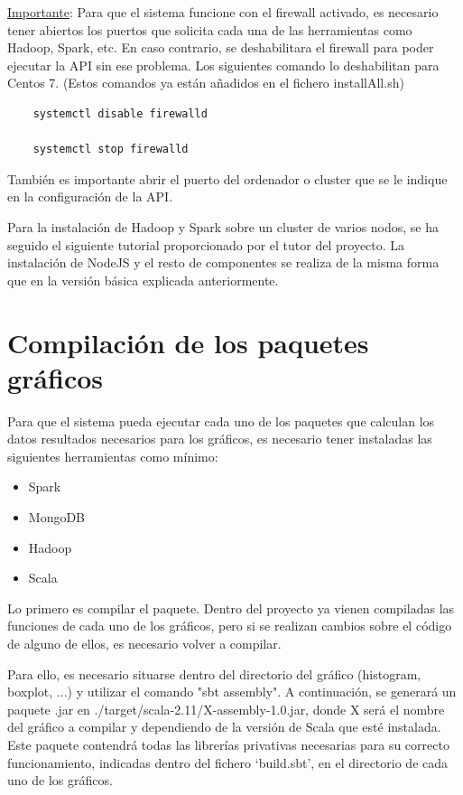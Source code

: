 \underline{Importante}: Para que el sistema funcione con el firewall activado, es necesario tener abiertos los puertos que solicita cada una de las herramientas como Hadoop, Spark, etc. En caso contrario, se deshabilitara el firewall para poder ejecutar la API sin ese problema. Los siguientes comando lo deshabilitan para Centos 7. (Estos comandos ya están añadidos en el fichero installAll.sh)

\begin{verbatim}
	systemctl disable firewalld
	
	systemctl stop firewalld
\end{verbatim}

También es importante abrir el puerto del ordenador o cluster que se le indique en la configuración de la API.

Para la instalación de Hadoop y Spark sobre un cluster de varios nodos, se ha seguido el siguiente tutorial \cite{InstalacionHadoopSparkNodos} proporcionado por el tutor del proyecto. La instalación de NodeJS y el resto de componentes se realiza de la misma forma que en la versión básica explicada anteriormente. 

\section{Compilación de los paquetes gráficos}

Para que el sistema pueda ejecutar cada uno de los paquetes que calculan los datos resultados necesarios para los gráficos, es necesario tener instaladas las siguientes herramientas como mínimo:
\begin{itemize}
	\item Spark
	\item MongoDB
	\item Hadoop
	\item Scala
\end{itemize}

Lo primero es compilar el paquete. Dentro del proyecto ya vienen compiladas las funciones de cada uno de los gráficos, pero si se realizan cambios sobre el código de alguno de ellos, es necesario volver a compilar. 

Para ello, es necesario situarse dentro del directorio del gráfico (histogram, boxplot, ...) y utilizar el comando "sbt assembly". A continuación, se generará un paquete .jar en ./target/scala-2.11/X-assembly-1.0.jar, donde X será el nombre del gráfico a compilar y dependiendo de la versión de Scala que esté instalada. Este paquete contendrá todas las librerías privativas necesarias para su correcto funcionamiento, indicadas dentro del fichero ‘build.sbt’, en el directorio de cada uno de los gráficos.

